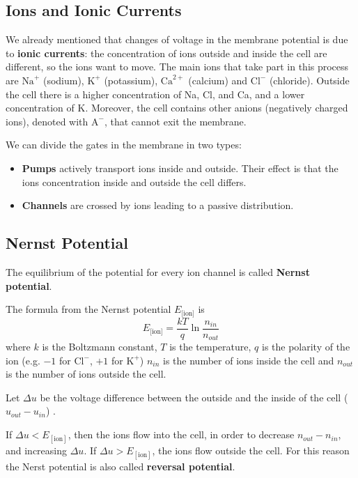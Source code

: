 \documentclass[oneside]{book}
\theoremstyle{definition}
\theoremstyle{plain}
\begin{document}
\subsection{Ions and Ionic Currents}
We already mentioned that changes of voltage in the membrane potential is due to \textbf{ionic currents}: the concentration of ions outside and inside the cell are different, so the ions want to move.
The main ions that take part in this process are $\text{Na}^+$ (sodium), $\mathrm{K}^+$ (potassium), $\mathrm{Ca}^{2+}$ (calcium) and $\mathrm{Cl}^-$ (chloride).
Outside the cell there is a higher concentration of Na, Cl, and Ca, and a lower concentration of K. Moreover, the cell contains other anions (negatively charged ions), denoted with $\mathrm{A}^-$, that cannot exit the membrane. 

We can divide the gates in the membrane in two types:


\begin{itemize}
    \item \textbf{Pumps} actively transport ions inside and outside. Their effect is that the ions concentration inside and outside the cell differs.
    \item \textbf{Channels} are crossed by ions leading to a passive distribution.
\end{itemize}

\subsection{Nernst Potential}

The equilibrium of the potential for every ion channel is called \textbf{Nernst potential}.

The formula from the Nernst potential $E_{\text{[ion]}}$ is
\[
    E_{\text{[ion]}} =\frac{kT}{q} \ln \frac{n_{in}}{n_{out}}
\]
where $k$ is the Boltzmann constant, $T$ is the temperature, $q$ is the polarity of the ion (e.g. $-1$ for $\mathrm{Cl}^-$, $+1$ for $\mathrm{K}^+$)  $n_{in}$ is the number of ions inside the cell and $n_{out}$ is the number of ions outside the cell.

Let $\Delta u$ be the voltage difference between the outside and the inside of the cell ($u_{out} -u_{in}$) .

If $\Delta u< E_{\mathrm{[ion]}}$, then the ions flow into the cell, in order to decrease $n_{out} - n_{in}$, and increasing $\Delta u$. If $\Delta u> E_{\mathrm{[ion]}}$, the ions flow outside the cell. 
For this reason the Nerst potential is also called \textbf{reversal potential}.
\end{document}
